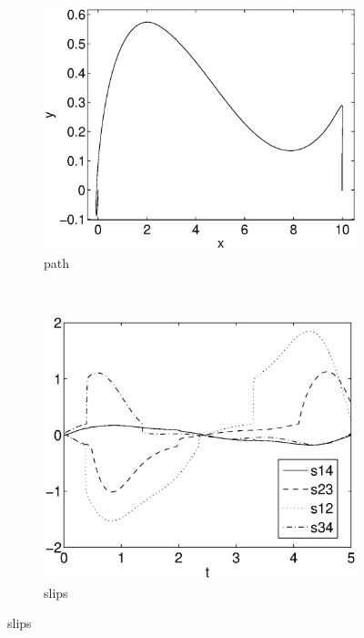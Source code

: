\begin{figure}[h]
\begin{subfigure}[b]{0.45\textwidth}
\centering
\includegraphics[width=\textwidth]{img/discont_ok_path.eps}
\caption{path}
\end{subfigure}
~
\begin{subfigure}[b]{0.45\textwidth}
\centering
\includegraphics[width=\textwidth]{img/discont_ok_slips.eps}
\caption{slips}
\end{subfigure}


\end{figure}
